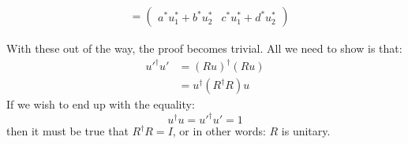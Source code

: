 \begin{sol}
\begin{prooof}
\begin{align*}
    &= \begin{pmatrix}a^*u_1^*+b^*u_2^* & c^*u_1^*+d^*u_2^*\end{pmatrix}
\end{align*}
\end{prooof}
With these out of the way, the proof becomes trivial. All we need to show is that:
\begin{align*}
    u'^\dagger u' &= (Ru)^\dagger (Ru) \\
    &= u^\dagger (R^\dagger R) u
\end{align*}
If we wish to end up with the equality:
$$u^\dagger u=u'^\dagger u' = 1$$
then it must be true that $R^\dagger R=I$, or in other words: $R$ is unitary.
\end{sol}